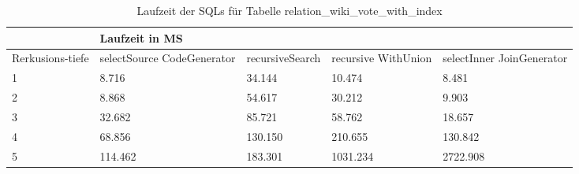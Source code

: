 \begin{table}[H]
	\centering
	\begin{tabular}{l|l|l|l|l|l|}
		\cline{2-6}
		& \multicolumn{5}{|l|}{Laufzeit in MS}                                                                                                                                                  \\ \hline
		\multicolumn{1}{|l|}{\multirow{2}{2cm}{Rerkusions-tiefe}} & \multicolumn{2}{|l|}{\multirow{2}{3cm}{selectSource CodeGenerator}} & \multirow{2}{2.8cm}{recursiveSearch} & \multirow{2}{2.5cm}{recursive WithUnion} & \multirow{2}{2.5cm}{selectInner JoinGenerator} \\
		\multicolumn{1}{|l|}{}
		& \multicolumn{2}{|l|}{}                                           &                                  &                                     &                                           \\ \hline
		
	\multicolumn{1}{|l|}{1}                                 & \multicolumn{2}{l|}{8.716}                                       & 34.144                                                & 10.474                                                    & 8.481                                                           \\ \hline
	\multicolumn{1}{|l|}{2}                                 & \multicolumn{2}{l|}{8.868}                                       & 54.617                                                & 30.212                                                    & 9.903                                                           \\ \hline
	\multicolumn{1}{|l|}{3}                                 & \multicolumn{2}{l|}{32.682}                                      & 85.721                                                & 58.762                                                    & 18.657                                                          \\ \hline
	\multicolumn{1}{|l|}{4}                                 & \multicolumn{2}{l|}{68.856}                                      & 130.150                                               & 210.655                                                   & 130.842                                                         \\ \hline
	\multicolumn{1}{|l|}{5}                                 & \multicolumn{2}{l|}{114.462}                                     & 183.301                                               & 1031.234                                                  & 2722.908                                                        \\ \hline
	
	\end{tabular}
	\caption{Laufzeit der SQLs für Tabelle relation\_wiki\_vote\_with\_index}
\end{table}

